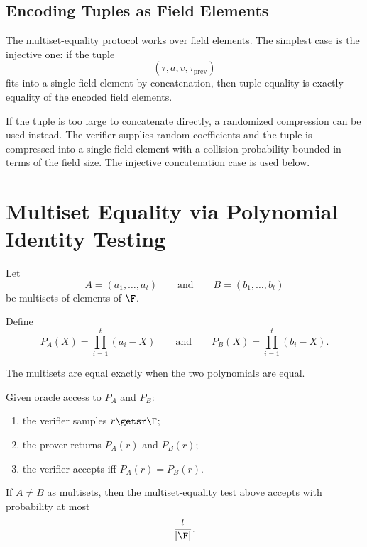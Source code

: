 \documentclass[11pt]{article}
\begin{document}
\subsection{Encoding Tuples as Field Elements}

The multiset-equality protocol works over field elements.  The simplest case is
the injective one: if the tuple
\[
  (\tau,a,v,\tau_{\mathrm{prev}})
\]
fits into a single field element by concatenation, then tuple equality is
exactly equality of the encoded field elements.

If the tuple is too large to concatenate directly, a randomized compression can
be used instead.  The verifier supplies random coefficients and the tuple is
compressed into a single field element with a collision probability bounded in
terms of the field size.  The injective concatenation case is used below.

\section{Multiset Equality via Polynomial Identity Testing}

Let
\[
  A = (a_1,\ldots,a_t)
  \qquad\text{and}\qquad
  B = (b_1,\ldots,b_t)
\]
be multisets of elements of $\F$.

\begin{definition}
Define
\[
  P_A(X) = \prod_{i=1}^{t}(a_i - X)
  \qquad\text{and}\qquad
  P_B(X) = \prod_{i=1}^{t}(b_i - X).
\]
\end{definition}

The multisets are equal exactly when the two polynomials are equal.

\begin{protocol}
Given oracle access to $P_A$ and $P_B$:
\begin{enumerate}
  \item the verifier samples $r \getsr \F$;
  \item the prover returns $P_A(r)$ and $P_B(r)$;
  \item the verifier accepts iff $P_A(r)=P_B(r)$.
\end{enumerate}
\end{protocol}

\begin{proposition}[Soundness]
If $A \neq B$ as multisets, then the multiset-equality test above accepts with
probability at most
\[
  \frac{t}{|\F|}.
\]
\end{proposition}
\end{document}
